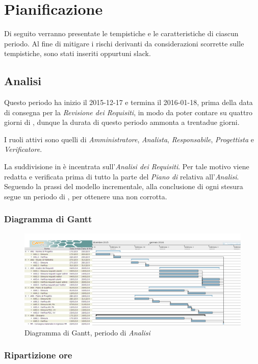 \section{Pianificazione}
Di seguito verranno presentate le tempistiche e le caratteristiche di
ciascun periodo. Al fine di mitigare i rischi derivanti da considerazioni
scorrette sulle tempistiche, sono stati inseriti oppurtuni slack.
\subsection{Analisi}
Questo periodo ha inizio il 2015-12-17 e termina il 2016-01-18, prima della data di consegna per la \textit{Revisione dei Requisiti}, in modo da poter contare su quattro giorni di , dunque la durata di questo periodo ammonta a trentadue giorni.

I ruoli attivi sono quelli di \textit{Amministratore}, \textit{Analista}, \textit{Responsabile}, \textit{Progettista} e \textit{Verificatore}.

La suddivisione in  \`e incentrata sull'\textit{Analisi dei Requisiti}. Per tale motivo viene redatta e verificata prima di tutto la parte del \textit{Piano di } relativa all'\textit{Analisi}. Seguendo la prassi del modello incrementale, alla conclusione di ogni stesura segue un periodo di , per ottenere una  non corrotta.
\subsubsection{Diagramma di Gantt}
\begin{figure}[ht!]
\includegraphics[width=1\textwidth]{res/img/pianificazione/Analisi.png}
\caption{Diagramma di Gantt, periodo di \textit{Analisi}}
\end{figure}

\subsubsection{Ripartizione ore}

